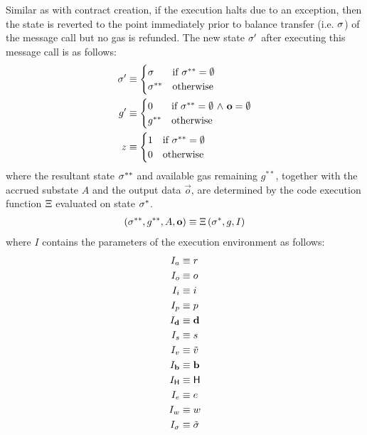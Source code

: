 Similar as with contract creation, if the execution halts due to an exception, then the state is reverted to the point immediately prior to balance transfer (i.e. $\mathbf{\sigma}$) of the message call but no gas is refunded.
The new state $\mathbf{\sigma}'$ after executing this message call is as follows:
\begin{align}
	\mathbf{\sigma}' &\equiv 
	\begin{cases}
		\mathbf{\sigma} 	 	& \mbox{if $\mathbf{\sigma}^{**}=\emptyset$}\\
		\mathbf{\sigma}^{**} 	& \mbox{otherwise}
	\end{cases}\\
	g' & \equiv 
	\begin{cases}
		0 & \mbox{if $\mathbf{\sigma}^{**} =\emptyset$ $\land$ $\mathbf{o}=\emptyset$}\\
		g^{**} & \mbox{otherwise}	
	\end{cases}\\
	z &\equiv 
	\begin{cases}
		1	 	& \mbox{if $\mathbf{\sigma}^{**}=\emptyset$}\\
		0	 	& \mbox{otherwise}
	\end{cases}
\end{align}
where the resultant state $\mathbf{\sigma}^{**}$ and available gas remaining $g^{**}$, together with the accrued substate $A$ and the output data $\vec{o}$, 
are determined by the code execution function $\mathrm{\Xi}$ evaluated on state $\mathbf{\sigma}^*$.
\begin{align}
	\left(\mathbf{\sigma}^{**}, g^{**},  A, \mathbf{o} \right) \equiv \mathrm{\Xi} \left(\mathbf{\sigma}^*, g, I  \right)
\end{align}
where $I$ contains the parameters of the execution environment as follows:
\begin{align}
	I_a &\eqdef r\\
	I_o &\eqdef o\\
	I_i &\eqdef i\\
	I_p &\eqdef p\\
	I_\vec{d} &\eqdef \vec{d}\\
	I_s &\eqdef s\\
	I_v &\eqdef \tilde{v}\\
	I_\vec{b} &\eqdef \vec{b}\\
	I_{\head} & \eqdef \head \\
	I_e &\eqdef e\\
	I_w &\eqdef w\\	%
	I_\st & \eqdef\tilde{\st}
\end{align}




